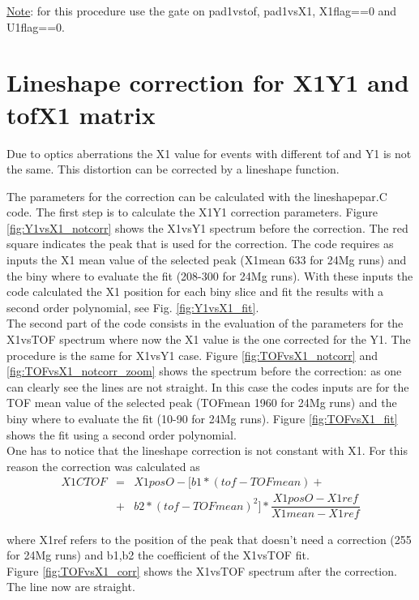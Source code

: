 \documentclass[]{report}
\begin{document}
\underline{Note}: for this procedure use the gate on pad1vstof, pad1vsX1, X1flag==0 and U1flag==0.

\section{Lineshape correction for X1Y1 and tofX1 matrix}
Due to optics aberrations the X1 value for events with different tof and Y1 is not the same. This distortion can be corrected by a lineshape function. 

The parameters for the correction can be calculated with the lineshapepar.C code.
The first step is to calculate the X1Y1 correction parameters. 
Figure \ref{fig:Y1vsX1_notcorr} shows the X1vsY1 spectrum before the correction. The red square indicates the peak that is used for the correction.
The code requires as inputs the X1 mean value of the selected peak (X1mean 633 for 24Mg runs) and the biny where to evaluate the fit (208-300 for 24Mg runs).
With these inputs the code calculated the X1 position for each biny slice and fit the results with a second order polynomial, see Fig. \ref{fig:Y1vsX1_fit}.\\
The second part of the code consists in the evaluation of the parameters for the X1vsTOF spectrum where now the X1 value is the one corrected for the Y1.
The procedure is the same for X1vsY1 case.
Figure \ref{fig:TOFvsX1_notcorr} and \ref{fig:TOFvsX1_notcorr_zoom} shows the spectrum before the correction: as one can clearly see the lines are not straight.
In this case the codes inputs are for the TOF mean value of the selected peak (TOFmean 1960 for 24Mg runs) and the biny where to evaluate the fit (10-90 for 24Mg runs). Figure \ref{fig:TOFvsX1_fit} shows the fit using a second order polynomial.\\
One has to notice that the lineshape correction is not constant with X1. For this reason the correction was calculated as
\begin{eqnarray}
X1CTOF&=&X1posO-[b1*(tof-TOFmean)+  \nonumber \\&+& b2*(tof-TOFmean)^2]*\dfrac{X1posO-X1ref}{X1mean-X1ref}
\end{eqnarray}

where X1ref refers to the position of the peak that doesn't need a correction (255 for 24Mg runs) and b1,b2 the coefficient of the X1vsTOF fit.\\
Figure \ref{fig:TOFvsX1_corr} shows the X1vsTOF spectrum after the correction. The line now are straight.
\end{document}
